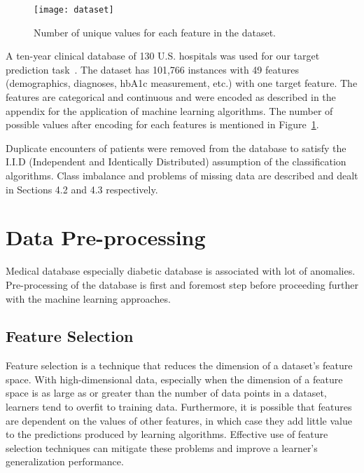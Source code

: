 \documentclass[conference]{IEEEtran}
\begin{document}

\begin{figure}[htpb]
	\centering
	\texttt{[image: dataset]}
	\caption{Number of unique values for each feature in the dataset.}
	\label{fig:dataset}
\end{figure}

A ten-year clinical database of 130 U.S. hospitals was used for our target prediction task~\cite{dataset-2014, hba1c-2014}. The dataset has 101,766 instances with 49 features (demographics, diagnoses, hbA1c measurement, etc.) with one target feature. The features are categorical and continuous and were encoded as described in the appendix for the application of machine learning algorithms. The number of possible values after encoding for each features is mentioned in Figure~\ref{fig:dataset}.

Duplicate encounters of patients were removed from the database to satisfy the I.I.D (Independent and Identically Distributed) assumption of the classification algorithms. Class imbalance and problems of missing data are described and dealt in Sections 4.2 and 4.3 respectively.

\section{Data Pre-processing}


Medical database especially diabetic database is associated with lot of anomalies. Pre-processing of the database is first and foremost step before proceeding further with the machine learning approaches.

\subsection{Feature Selection}
Feature selection is a technique that reduces the dimension of a dataset's feature space. With high-dimensional data, especially when the dimension of a feature space is as large as or greater than the number of data points in a dataset, learners tend to overfit to training data. Furthermore, it is possible that features are dependent on the values of other features, in which case they add little value to the predictions produced by learning algorithms. Effective use of feature selection techniques can mitigate these problems and improve a learner's generalization performance. 
\end{document}
